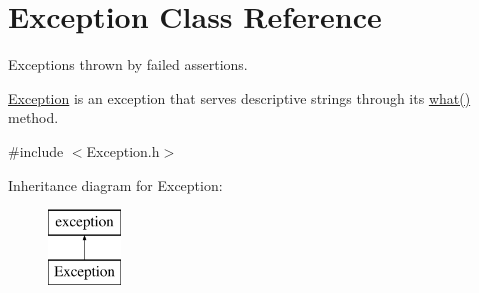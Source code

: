 \hypertarget{class_exception}{}\section{Exception Class Reference}
\label{class_exception}


Exceptions thrown by failed assertions.

\hyperlink{class_exception}{Exception} is an exception that serves descriptive strings through its \hyperlink{class_exception_a45642915395d3b813fedc2593fbcb8bb}{what()} method.  




{\ttfamily \#include $<$Exception.\+h$>$}

Inheritance diagram for Exception\+:\begin{figure}[H]
\begin{center}
\leavevmode
\includegraphics[height=2.000000cm]{class_exception}
\end{center}
\end{figure}
